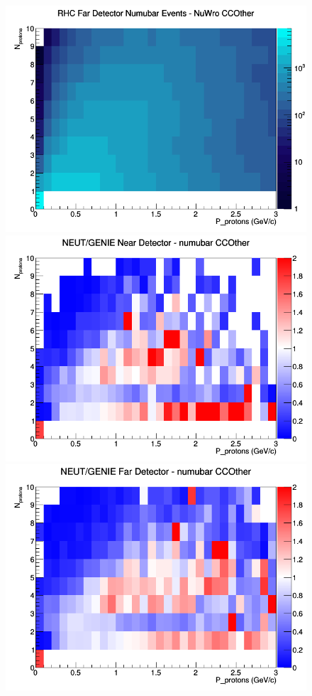 \begin{figure}[h]
\endminipage
{}
\includegraphics[width=\linewidth]{N_P/nominal/protons/CCOther_RHC_FD_numubar_N_P_NuWro.png}
\endminipage
\newline
{}
\includegraphics[width=\linewidth]{N_P/nominal/protons/ratios/CCOther_NEUT_GENIE_numubar_near_N_P.png}
\endminipage
{}
\includegraphics[width=\linewidth]{N_P/nominal/protons/ratios/CCOther_NEUT_GENIE_numubar_far_N_P.png}

\end{figure}
